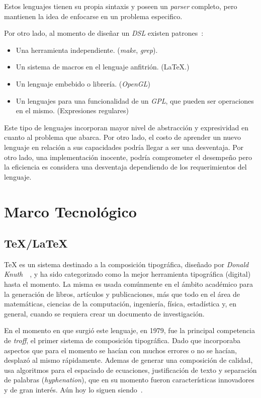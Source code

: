 \documentclass[12pt,letterpaper,titlepage,oneside,openright]{book}
\newcommand{\latex}{\LaTeX\xspace}
\newcommand{\tex}{\TeX\xspace}
\begin{document}
Estos lenguajes tienen su propia sintaxis y poseen un \textit{parser} completo, pero mantienen la idea de enfocarse en un problema especifico.

Por otro lado, al momento de diseñar un \textit{DSL} existen patrones~\cite{mernik2005and}:

\begin{itemize}
    \item Una herramienta independiente. (\textit{make}, \textit{grep}).
    \item Un sistema de macros en el lenguaje anfitrión. (\latex.)
    \item Un lenguaje embebido o librería. (\textit{OpenGL})
    \item Un lenguajes para una funcionalidad de un \textit{GPL}, que pueden ser operaciones en el mismo. (Expresiones regulares)
\end{itemize}

Este tipo de lenguajes incorporan mayor nivel de abstracción y expresividad en cuanto al problema que abarca. Por otro lado, el costo de aprender un nuevo lenguaje en relación a sus capacidades podría llegar a ser una desventaja. Por otro lado, una implementación inocente, podría comprometer el desempeño pero la eficiencia es considera una desventaja dependiendo de los requerimientos del lenguaje.

\chapter{Marco Tecnológico}

\section{\tex/\latex}

\tex es un sistema destinado a la composición tipográfica, diseñado por \textit{Donald Knuth}~\cite{knuth1984texbook}~\cite{weblatex}, y ha sido categorizado como la mejor herramienta tipográfica (digital) hasta el momento. La misma es usada comúnmente en el ámbito académico para la generación de libros, artículos y publicaciones, más que todo en el área de matemáticas, ciencias de la computación, ingeniería, física, estadística y, en general, cuando se requiera crear un documento de investigación.

En el momento en que surgió este lenguaje, en 1979, fue la principal competencia de \textit{troff}, el primer sistema de composición tipográfica. Dado que incorporaba aspectos que para el momento se hacían con muchos errores o no se hacían, desplazó al mismo rápidamente. Ademas de generar una composición de calidad, usa algoritmos para el espaciado de ecuaciones, justificación de texto y separación de palabras (\textit{hyphenation}), que en su momento fueron características innovadores y de gran interés. Aún hoy lo siguen siendo~\cite{knuth1999digital}.
\end{document}
